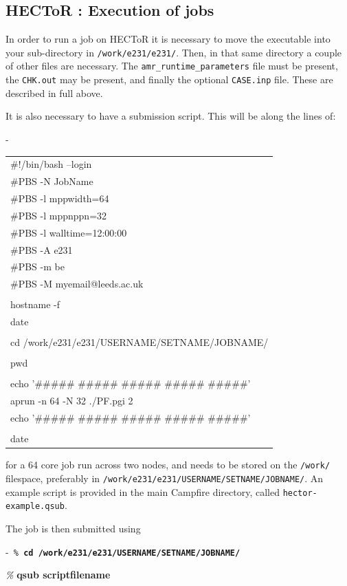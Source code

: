 \documentclass[paper=a4, fontsize=11pt,twoside,bibtotoc]{scrartcl}		%
\newenvironment{codebox}{\begin{center}\begin{MakeFramed}{\hsize0.99\linewidth\advance\hsize-\width\FrameRestore}\tt}{\end{MakeFramed}\end{center}}
\newenvironment{filebox}{\begin{center}\begin{MakeFramed}{\hsize0.99\linewidth\advance\hsize-\width\FrameRestore}\tt\begin{tabular}{l}}{\end{tabular}\end{MakeFramed}\end{center}}
\newcommand{\prompt}[1]{\textsl{\%} \textbf{#1}}
\begin{document}
\subsection[Execution of jobs]{HECToR : Execution of jobs}

In order to run a job on HECToR it is necessary to move the executable into your sub-directory in \texttt{/work/e231/e231/}.  Then, in that same directory a 
couple of other files are necessary.  The \texttt{amr\_runtime\_parameters} file must be present, the \texttt{CHK.out} may be present, and finally the optional 
\texttt{CASE.inp} file.  These are described in full above.

It is also necessary to have a submission script.  This will be along the lines of:
\begin{filebox}
	\#!/bin/bash --login\\
	\#PBS -N JobName\\
	\#PBS -l mppwidth=64\\
	\#PBS -l mppnppn=32\\
	\#PBS -l walltime=12:00:00\\
	\#PBS -A e231\\
	\#PBS -m be\\
	\#PBS -M myemail@leeds.ac.uk\\
	\\
	hostname -f\\
	date\\
	\\
	cd /work/e231/e231/USERNAME/SETNAME/JOBNAME/\\
 	\\	
	pwd\\
	\\
	echo '\#\#\#\#\# \#\#\#\#\# \#\#\#\#\# \#\#\#\#\# \#\#\#\#\#'\\
	aprun -n 64 -N 32 ./PF.pgi 2\\
	echo '\#\#\#\#\# \#\#\#\#\# \#\#\#\#\# \#\#\#\#\# \#\#\#\#\#'\\
	\\
	date\\
\end{filebox}
for a 64 core job run across two nodes, and needs to be stored on the \texttt{/work/} filespace, preferably in 
\texttt{/work/e231/e231/USERNAME/SETNAME/JOBNAME/}.  An example script is provided in the main Campfire directory, called \texttt{hector-example.qsub}.

The job is then submitted using
\begin{codebox}
        \prompt{cd /work/e231/e231/USERNAME/SETNAME/JOBNAME/}

	\prompt{qsub scriptfilename}
\end{codebox}
\end{document}
